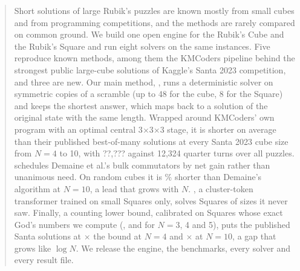 \newcommand{\MsevenSantaTotal}{??,???}

\begin{abstract}
Short solutions of large Rubik's puzzles are known mostly from small cubes and from programming competitions, and the methods
are rarely compared on common ground. We build one open engine for the  Rubik's Cube and the  Rubik's Square and
run eight solvers on the same instances. Five reproduce known methods, among them the KMCoders pipeline behind the strongest
public large-cube solutions of Kaggle's Santa 2023 competition, and three are new. Our main method, \Mseven, runs a deterministic
solver on symmetric copies of a scramble (up to 48 for the cube, 8 for the Square) and keeps the shortest answer, which maps back
to a solution of the original state with the same length. Wrapped around KMCoders' own program with an optimal central
3$\times$3$\times$3 stage, it is shorter on average than their published best-of-many solutions at every Santa 2023 cube size
from $N=4$ to 10, with \MsevenSantaTotal{} against 12,324 quarter turns over all \SantaTotal{} puzzles. \FiveC schedules
Demaine et al.'s bulk commutators by net gain rather than unanimous need. On random cubes it is \FiveCGainTen\% shorter than
Demaine's algorithm at $N=10$, a lead that grows with $N$. \FiveA, a cluster-token transformer trained on small Squares only,
solves Squares of sizes it never saw. Finally, a counting lower bound, calibrated on Squares whose exact God's numbers we
compute (\GodSquareThree, \GodSquareFour{} and \GodSquareFive{} for $N=3$, 4 and 5), puts the published Santa solutions at
\PubOverBoundFour{}$\times$ the bound at $N=4$ and \PubOverBoundTen{}$\times$ at $N=10$, a gap that grows like $\log N$. We
release the engine, the benchmarks, every solver and every result file.
\end{abstract}


